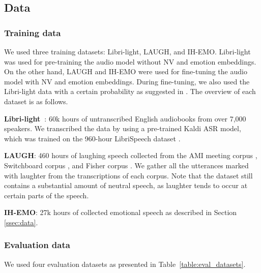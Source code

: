 \vspace{-.5em}
\subsection{Data}

\vspace{-.5em}
\subsubsection{Training data}

\vspace{-.5em}

We used three training datasets: Libri-light, LAUGH, and IH-EMO. Libri-light was used for pre-training the audio model without NV and emotion embeddings. On the other hand, LAUGH and IH-EMO were used for fine-tuning the audio model with NV and emotion embeddings. During fine-tuning, we also used the Libri-light data with a certain probability as suggested in \cite{kanda2024making}. The overview of each dataset is as follows.

\textbf{Libri-light~\cite{kahn2020libri}}: 60k hours of untranscribed English audiobooks from over 7,000 speakers. 
We transcribed the data by using a pre-trained Kaldi ASR model, 
which was trained on the 960-hour LibriSpeech dataset \cite{panayotov2015librispeech}.

\textbf{LAUGH}: 460 hours of laughing speech collected from the AMI meeting corpus \cite{carletta2005ami}, Switchboard corpus \cite{godfrey1992switchboard}, and Fisher corpus \cite{cieri2004fisher}. We gather all the utterances marked with laughter from the transcriptions of each corpus.  Note that the dataset still contains a substantial amount of neutral speech, as laughter tends to occur at certain parts of the speech.

\textbf{IH-EMO}: 27k hours of collected emotional speech as described in Section \ref{ssec:data}.


\vspace{-.5em}
\subsubsection{Evaluation data}
\vspace{-.5em}

We used four evaluation datasets as presented in Table~\ref{table:eval_datasets}.




